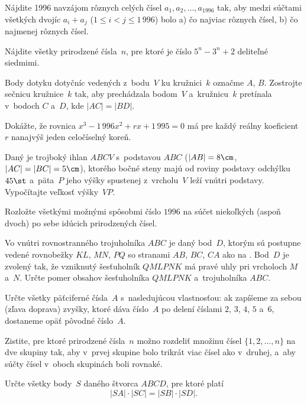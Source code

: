 {%
Nájdite 1996 navzájom rôznych celých čísel $a_1,a_2,\dots,a_{1996}$ tak, aby medzi súčtami všetkých dvojíc
$a_i+a_j$ ($1\le i<j\le1\,996$) bolo
\ite a) čo najviac rôznych čísel,
\ite b) čo najmenej rôznych čísel.
}

{%
Nájdite všetky prirodzené čísla~$n$, pre ktoré je číslo
$5^n-3^n+2$ deliteľné siedmimi.}

{%
Body dotyku dotyčníc vedených z~bodu~$V$ ku kružnici~$k$
označme $A$, $B$. Zostrojte  sečnicu kružnice~$k$ tak, aby
prechádzala bodom~$V$ a~kružnicu~$k$ pretínala v~bodoch $C$ a~$D$,
kde $|AC|=|BD|$.}

{%
Dokážte, že rovnica $x^3-1\,996x^2+rx+1\,995=0$ má pre každý
reálny koeficient~$r$ nanajvýš jeden celočíselný koreň.}

{%
Daný je  trojboký ihlan $ABCV$ s~podstavou $ABC$
($|AB|=8\cm$, $|AC|=|BC|=5\cm$), ktorého bočné steny
majú od roviny podstavy odchýlku $45\st$ a~päta~$P$ jeho výšky
spustenej z~vrcholu~$V$ leží vnútri podstavy. Vypočítajte veľkosť
výšky~$VP$.}

{%
Rozložte všetkými možnými spôsobmi číslo $1996$ na súčet
niekoľkých (aspoň dvoch) po sebe idúcich prirodzených čísel.}

{%
Vo vnútri rovnostranného trojuholníka $ABC$ je daný bod~$D$, ktorým
sú postupne vedené rovnobežky $KL$, $MN$, $PQ$ so stranami
$AB$, $BC$, $CA$ ako na \obr. Bod~$D$ je zvolený tak, že
vzniknutý šesťuholník $QMLPNK$ má pravé uhly pri vrcholoch $M$
a~$N$. Určte pomer obsahov šesťuholníka $QMLPNK$ a~trojuholníka
$ABC$.
%
}

{%
Určte všetky päťciferné čísla~$A$ s~nasledujúcou vlastnosťou:
ak zapíšeme za sebou (zľava doprava) zvyšky, ktoré dáva číslo~$A$ po delení
číslami $2$, $3$, $4$, $5$ a~$6$, dostaneme opäť pôvodné číslo~$A$.}

{%
Zistite, pre ktoré prirodzené čísla~$n$ možno
rozdeliť množinu čísel $\{1, 2, \dots, n\}$ na dve skupiny tak, aby
v~prvej skupine bolo trikrát viac čísel ako v~druhej, a~aby
súčty čísel v~oboch skupinách boli rovnaké.}

{%
Určte všetky body~$S$ daného štvorca $ABCD$, pre ktoré
platí
$$
|SA|\cdot|SC|=|SB|\cdot|SD|.
$$
}

